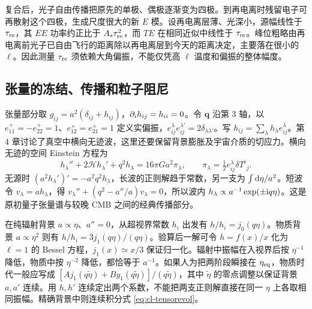 复合后，光子自由传播把原先的单极、偶极逐渐变为四极。到再电离时残留电子可再散射这个四极，生成尺度很大的新 $E$ 模。设再电离层薄、光深小，源幅线性于 $\tau_{\rm re}$，其 $EE$ 功率约正比于 $A_s\tau_{\rm re}^2$，而 $TE$ 在相同近似中线性于 $\tau_{\rm re}$。峰位粗略由再电离前光子已自由飞行的距离除以再电离层到今天的距离决定，主要落在很小的 $\ell$。因此测量 $\tau_{\rm re}$ 须依赖大角偏振，不能仅凭高 $\ell$ 温度和偏振的整体幅度。

\subsection{张量的冻结、传播和粒子阻尼}

张量部分取 $g_{ij}=a^2(\delta_{ij}+h_{ij})$，$\partial_i h_{ij}=h_{ii}=0$。令 $\bm q$ 沿第 3 轴，以 $e^+_{11}=-e^+_{22}=1$、$e^\times_{12}=e^\times_{21}=1$ 定义实偏振，$e^\lambda_{ij}e^{\lambda'}_{ij}=2\delta_{\lambda\lambda'}$。写 $h_{ij}=\sum_\lambda h_\lambda e^\lambda_{ij}$。第 4 章讨论了真空中横向无迹波，这里还要保留背景膨胀及宇宙介质的切应力。横向无迹的空间 Einstein 方程为
\begin{equation}\label{eq:cl-tensorevol}
 h_\lambda''+2\mathcal Hh_\lambda'+q^2h_\lambda
      =16\pi G a^2\pi_\lambda,\qquad
 \pi_\lambda=\tfrac12e^\lambda_{ij}\delta T^i{}_j .
\end{equation}
无源时 $(a^2h_\lambda')'=-a^2q^2h_\lambda$，长波的正则解趋于常数，另一支为 $\int \dd\eta/a^2$。短波令 $v_\lambda=a h_\lambda$，得 $v_\lambda''+(q^2-a''/a)v_\lambda=0$，所以波内 $h_\lambda\propto a^{-1}\exp(\pm\mathrm{i} q\eta)$。这是原初量子张量谱与较晚 CMB 之间的经典传播部分。

在纯辐射背景 $a\propto\eta$、$a''=0$，从超视界常数 $h_i$ 出发有 $h/h_i=j_0(q\eta)$。物质背景 $a\propto\eta^2$ 则有 $h/h_i=3j_1(q\eta)/(q\eta)$。验算后一解可令 $h=f(x)/x$ 化为 $\ell=1$ 的 Bessel 方程，$j_1(x)\simeq x/3$ 保证归一化。辐射中振幅在入视界后按 $\eta^{-1}$ 降低，物质中按 $\eta^{-2}$ 降低，都恰等于 $a^{-1}$。如果人为把两阶段瞬接在 $\eta_{\rm eq}$，物质时代一般应写成 $[A j_1(q\widetilde\eta)+B y_1(q\widetilde\eta)]/(q\widetilde\eta)$，其中 $\widetilde\eta$ 的零点调整以保证背景 $a,a'$ 连续。用 $h,h'$ 连续定出两个系数，不能把两支正则解直接在同一 $\eta$ 上各取相同振幅。精确背景中则连续积分式 \eqref{eq:cl-tensorevol}。

